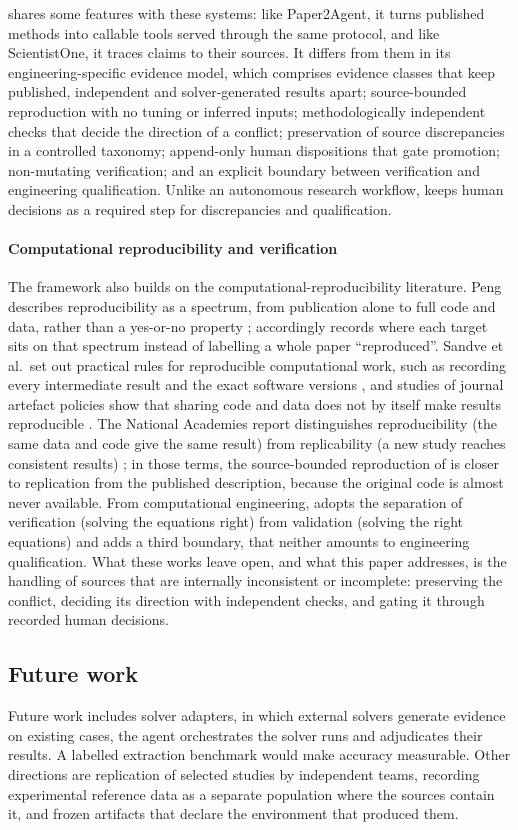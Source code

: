 \engiproof{} shares some features with these systems: like Paper2Agent, it turns published methods into callable tools served through the same protocol, and like ScientistOne, it traces claims to their sources. It differs from them in its engineering-specific evidence model, which comprises evidence classes that keep published, independent and solver-generated results apart; source-bounded reproduction with no tuning or inferred inputs; methodologically independent checks that decide the direction of a conflict; preservation of source discrepancies in a controlled taxonomy; append-only human dispositions that gate promotion; non-mutating verification; and an explicit boundary between verification and engineering qualification. Unlike an autonomous research workflow, \engiproof{} keeps human decisions as a required step for discrepancies and qualification.

\paragraph{Computational reproducibility and verification}
The framework also builds on the computational-reproducibility literature. Peng describes reproducibility as a spectrum, from publication alone to full code and data, rather than a yes-or-no property \cite{Peng2011}; \engiproof{} accordingly records where each target sits on that spectrum instead of labelling a whole paper ``reproduced''. Sandve et al.\ set out practical rules for reproducible computational work, such as recording every intermediate result and the exact software versions \cite{Sandve2013}, and studies of journal artefact policies show that sharing code and data does not by itself make results reproducible \cite{Stodden2018,Collberg2016}. The National Academies report distinguishes reproducibility (the same data and code give the same result) from replicability (a new study reaches consistent results) \cite{NASEM2019}; in those terms, the source-bounded reproduction of \engiproof{} is closer to replication from the published description, because the original code is almost never available. From computational engineering, \engiproof{} adopts the separation of verification (solving the equations right) from validation (solving the right equations) \cite{Oberkampf2010} and adds a third boundary, that neither amounts to engineering qualification. What these works leave open, and what this paper addresses, is the handling of sources that are internally inconsistent or incomplete: preserving the conflict, deciding its direction with independent checks, and gating it through recorded human decisions.

\subsection{Future work}
Future work includes solver adapters, in which external solvers generate  evidence on existing cases, the agent orchestrates the solver runs and \engiproof{} adjudicates their results. A labelled extraction benchmark would make accuracy measurable. Other directions are replication of selected studies by independent teams, recording experimental reference data as a separate population where the sources contain it, and frozen artifacts that declare the environment that produced them.
